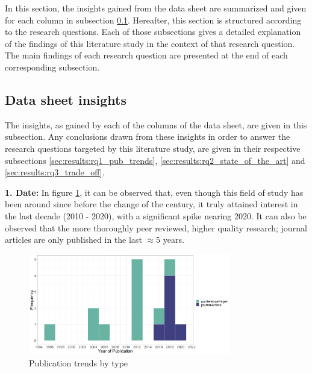 \vspace{5mm}

In this section, the insights gained from the data sheet are summarized and given for each column in subsection \ref{sec:results:insights}.
Hereafter, this section is structured according to the research questions.
Each of those subsections gives a detailed explanation of the findings of this literature study in the context of that research question.
The main findings of each research question are presented at the end of each corresponding subsection.

\subsection{Data sheet insights}
\label{sec:results:insights}
The insights, as gained by each of the columns of the data sheet, are given in this subsection.
Any conclusions drawn from these insights in order to answer the research questions targeted by this literature study,
are given in their respective subsections \ref{sec:results:rq1_pub_trends}, \ref{sec:results:rq2_state_of_the_art} and \ref{sec:results:rq3_trade_off}.

\vspace{5mm}

\noindent\textbf{1. Date:}
In figure \ref{fig:pub_trends}, it can be observed that, even though this field of study has been around since before the change of the century,
it truly attained interest in the last decade (2010 - 2020), with a significant spike nearing 2020.
It can also be observed that the more thoroughly peer reviewed, higher quality research; journal articles are only published in the last $\approx$5 years.

\begin{figure}[t]
    \includegraphics[width=250pt]{figures/publication_trend_extended.png}
    \caption{Publication trends by type}
    \label{fig:pub_trends}
\end{figure}

\vspace{5mm}

